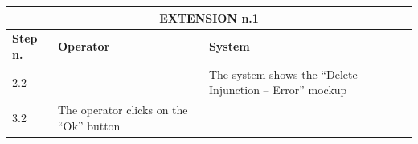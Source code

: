 {{{			\begin{table}[h]
			\begin{tabular}{|p{2cm}|p{6cm}|p{6cm}|}
			\hline
				\multicolumn{3}{|c|}{EXTENSION n.1}\\
			\hline
				\centering \vspace{1mm} \bfseries{Step n.} \vspace{1mm} & \vspace{1mm} \bfseries{Operator} \vspace{1mm} & \vspace{1mm} \bfseries{System} \vspace{1mm}\\
			\hline
				\vspace{1mm} 2.2\vspace{1mm} &
				\vspace{1mm} \vspace{1mm} & 
				\vspace{1mm} The system shows the “Delete Injunction – Error” mockup\vspace{1mm} \\
			\hline
				\vspace{1mm} 3.2\vspace{1mm} &
				\vspace{1mm} The operator clicks on the “Ok”  button\vspace{1mm} & 
				\vspace{1mm} \vspace{1mm} \\
			\hline
			\end{tabular}
			\end{table}
			
			\clearpage

}}}
